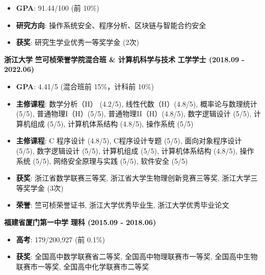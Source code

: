     \begin{itemize}
        \item \textbf{GPA}: 91.44/100 (前 10\%)
        \item \textbf{研究方向}: 操作系统安全、程序分析、区块链与智能合约安全
        \item \textbf{获奖}: 研究生学业优秀一等奖学金 (2次)
    \end{itemize}

    \noindent \textbf{浙江大学} \textbar{} \textbf{竺可桢荣誉学院混合班 \& 计算机科学与技术} \textbar{} \textbf{工学学士 (2018.09 - 2022.06)}

    \begin{itemize}
        \item \textbf{GPA}: 4.41/5 (混合班前 15\%，计科前 10\%)
              \ifdefined\qr
        \item \textbf{主修课程}: 数学分析（H） (4.2/5), 线性代数（H）(4.8/5), 概率论与数理统计(5/5), 普通物理I（H）(5/5), 普通物理II（H）(4.8/5), 数字逻辑设计 (5/5), 计算机组成 (5/5), 计算机体系结构 (4.8/5), 操作系统 (5/5)
              \else
        \item \textbf{主修课程}: C 程序设计 (4.8/5), C程序设计专题 (5/5), 面向对象程序设计 (5/5), 数字逻辑设计 (5/5), 计算机组成 (5/5), 计算机体系结构 (4.8/5), 操作系统 (5/5), 网络安全原理与实践 (5/5), 软件安全 (5/5)
              \fi
        \item \textbf{获奖}: 浙江省数学联赛三等奖, 浙江省大学生物理创新竞赛三等奖, 浙江大学三等奖学金 (3次)
        \item \textbf{荣誉}: 竺可桢荣誉证书, 浙江大学优秀毕业生, 浙江大学优秀毕业论文
    \end{itemize}

    \noindent \textbf{福建省厦门第一中学} \textbar{} \textbf{理科 (2015.09 - 2018.06)}

    \begin{itemize}
        \item \textbf{高考}: 179/200,927 (前 0.1\%)
        \item \textbf{获奖}: 全国高中数学联赛省二等奖, 全国高中物理联赛市一等奖, 全国高中生物联赛市一等奖, 全国高中化学联赛市二等奖
    \end{itemize}

\fi

